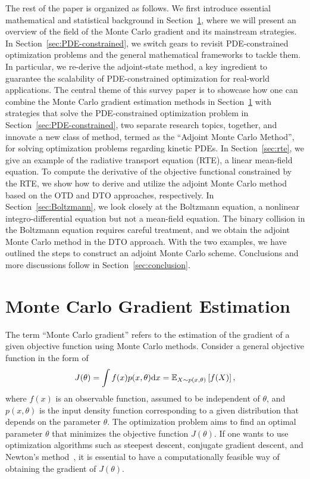 \documentclass[12pt]{amsart}
\newcommand{\rd}{\mathrm{d}}
\begin{document}
The rest of the paper is organized as follows. We first introduce essential mathematical and statistical background in Section~\ref{sec:background}, where we will present an overview of the field of the Monte Carlo gradient and its mainstream strategies. In Section~\ref{sec:PDE-constrained}, we switch gears to revisit PDE-constrained optimization problems and the general mathematical frameworks to tackle them. In particular, we re-derive the adjoint-state method, a key ingredient to guarantee the scalability of PDE-constrained optimization for real-world applications. The central theme of this survey paper is to showcase how one can combine the Monte Carlo gradient estimation methods in Section~\ref{sec:background} with strategies that solve the PDE-constrained optimization problem in Section~\ref{sec:PDE-constrained}, two separate research topics, together, and innovate a new class of method, termed as the ``Adjoint Monte Carlo Method'', for solving optimization problems regarding kinetic PDEs. In Section~\ref{sec:rte}, we give an example of the radiative transport equation (RTE), a linear mean-field equation. To compute the derivative of the objective functional constrained by the RTE, we show how to derive and utilize the adjoint Monte Carlo method based on the OTD and DTO approaches, respectively. In Section~\ref{sec:Boltzmann}, we look closely at the Boltzmann equation, a nonlinear integro-differential equation but not a mean-field equation. The binary collision in the Boltzmann equation requires careful treatment, and we obtain the adjoint Monte Carlo method in the DTO approach. With the two examples, we have outlined the steps to construct an adjoint Monte Carlo scheme. Conclusions and more discussions follow in Section~\ref{sec:conclusion}.






\section{Monte Carlo Gradient Estimation}\label{sec:background}
The term ``Monte Carlo gradient'' refers to the estimation of the gradient of a given objective function using Monte Carlo methods. Consider a general objective function in the form of
\begin{equation}\label{eq:main_obj}
    J(\theta) = \int f(x) p(x,\theta) \rd x = \bbE_{X\sim p(x,\theta)}\left[f(X) \right],
\end{equation}
where $f(x)$ is an observable function, assumed to be independent of $\theta$, and $p(x,\theta)$ is the input density function corresponding to a given distribution that depends on the parameter $\theta$. The optimization problem aims to find an optimal parameter $\theta$ that minimizes the objective function $J(\theta)$. If one wants to use optimization algorithms such as steepest descent, conjugate gradient descent, and Newton's method~\cite{nocedal2006numerical}, it is essential to have a computationally feasible way of obtaining the gradient of $J(\theta)$. 
\end{document}
